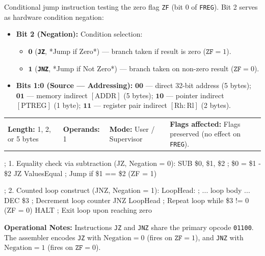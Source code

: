 \documentclass[11pt,a4paper]{article}
\newcommand{\reg}{\$}
\begin{document}
\begin{instructiondesc}[title={Detailed Description and Microcode Semantics},top=2pt,bottom=2pt]
Conditional jump instruction testing the zero flag \texttt{ZF} (bit 0 of \texttt{FREG}). Bit 2 serves as hardware condition negation:
\begin{itemize}[leftmargin=8pt,itemsep=0.3pt,topsep=0.3pt,parsep=0pt]
    \item \textbf{Bit 2 (Negation):} Condition selection:
    \begin{itemize}[leftmargin=8pt,itemsep=0.15pt,topsep=0.15pt,parsep=0pt]
        \item \(\mathbf{0}\) (\textbf{\texttt{JZ}}, *Jump if Zero*) --- branch taken if result is zero (\(\texttt{ZF} = 1\)).
        \item \(\mathbf{1}\) (\textbf{\texttt{JNZ}}, *Jump if Not Zero*) --- branch taken on non-zero result (\(\texttt{ZF} = 0\)).
    \end{itemize}
    \item \textbf{Bits 1:0 (Source --- Addressing):} \(\mathbf{00}\) --- direct 32-bit address (5 bytes); \(\mathbf{01}\) --- memory indirect \([\text{ADDR}]\) (5 bytes); \(\mathbf{10}\) --- pointer indirect \([\text{PTREG}]\) (1 byte); \(\mathbf{11}\) --- register pair indirect \([\text{Rh}:\text{Rl}]\) (2 bytes).
\end{itemize}
\end{instructiondesc}

\begin{tcolorbox}[
    enhanced,
    colback=limcard,
    colframe=limborder,
    boxrule=0.6pt,
    arc=3pt,
    left=8pt,right=8pt,top=2.5pt,bottom=2.5pt
]
    \footnotesize
    \noindent
    \begin{tabularx}{\textwidth}{@{}l l l X@{}}
        \textbf{Length:} 1, 2, or 5 bytes &
        \textbf{Operands:} 1 &
        \textbf{Mode:} User / Supervisor &
        \textbf{Flags affected:} Flags preserved (no effect on \texttt{FREG}).
    \end{tabularx}
\end{tcolorbox}

\begin{examplebox}[title={Usage Example (LIM2 Assembly)},top=2.5pt,bottom=2.5pt]
\begin{limasm}
; 1. Equality check via subtraction (JZ, Negation = 0):
SUB  \reg0, \reg1, \reg2     ; \reg0 = \reg1 - \reg2
JZ   ValuesEqual             ; Jump if \reg1 == \reg2 (ZF = 1)

; 2. Counted loop construct (JNZ, Negation = 1):
LoopHead:
    ; ... loop body ...
    DEC  \reg3               ; Decrement loop counter
    JNZ  LoopHead            ; Repeat loop while \reg3 != 0 (ZF = 0)
    HALT                     ; Exit loop upon reaching zero
\end{limasm}
\vspace{0.5mm}
\footnotesize\color{limmuted}
\textbf{Operational Notes:} Instructions \texttt{JZ} and \texttt{JNZ} share the primary opcode \texttt{01100}. The assembler encodes \texttt{JZ} with \(\text{Negation}=0\) (fires on \(\texttt{ZF}=1\)), and \texttt{JNZ} with \(\text{Negation}=1\) (fires on \(\texttt{ZF}=0\)).
\end{examplebox}
\end{document}
